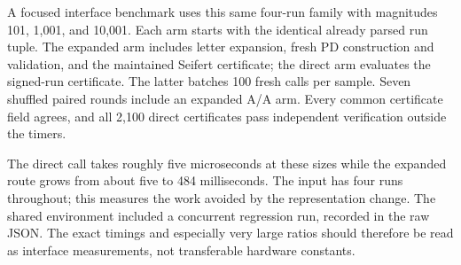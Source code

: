 A focused interface benchmark uses this same four-run family with magnitudes
101, 1,001, and 10,001. Each arm starts with the identical already parsed run
tuple. The expanded arm includes letter expansion, fresh PD construction and
validation, and the maintained Seifert certificate; the direct arm evaluates
the signed-run certificate. The latter batches 100 fresh calls per sample.
Seven shuffled paired rounds include an expanded A/A arm. Every common
certificate field agrees, and all 2,100 direct certificates pass independent
verification outside the timers.
\begin{table}[htbp]
\centering\small

\caption{Structural certificate evaluation from the same run input. Note the
different time units. These timings include the representation conversion
required by the expanded route and do not measure the full recognition portfolio.}
\label{tab:structural}
\end{table}
The direct call takes roughly five microseconds at these sizes while the
expanded route grows from about five to 484 milliseconds. The input has four
runs throughout; this measures the work avoided by the representation change.
The shared environment included a concurrent regression run, recorded in the
raw JSON. The exact timings and especially very large ratios should therefore
be read as interface measurements, not transferable hardware constants.
